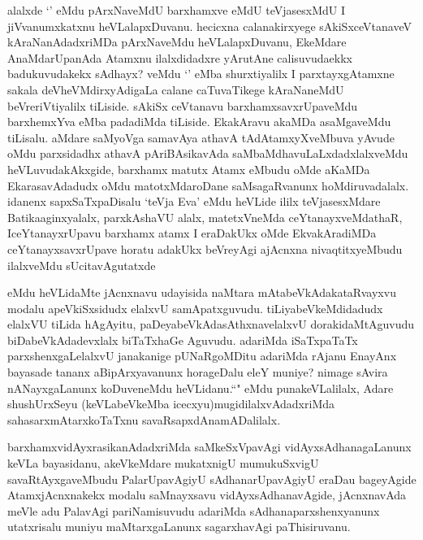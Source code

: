 \begin{artha}
alalxde `\stext' eMdu pArxNaveMdU barxhamxve eMdU teVjasesxMdU I jiVvanumxkatxnu heVLalapxDuvanu. hecicxna calanakirxyege sAkiSxceVtanaveV kAraNanAdadxriMDa pArxNaveMdu heVLalapxDuvanu, EkeMdare AnaMdarUpanAda Atamxnu ilalxdidadxre yArutAne calisuvudaekkx badukuvudakekx sAdhayx? veMdu `\stext' eMba shurxtiyalilx I parxtayxgAtamxne sakala deVheVMdirxyAdigaLa calane caTuvaTikege kAraNaneMdU beVreriVtiyalilx tiLiside. sAkiSx ceVtanavu barxhamxsavxrUpaveMdu barxhemxYva eMba padadiMda tiLiside. EkakAravu akaMDa asaMgaveMdu tiLisalu. aMdare saMyoVga samavAya athavA tAdAtamxyXveMbuva yAvude oMdu parxsidadhx athavA pAriBAsikavAda saMbaMdhavuLaLxdadxlalxveMdu heVLuvudakAkxgide, barxhamx matutx Atamx eMbudu oMde aKaMDa EkarasavAdadudx oMdu matotxMdaroDane saMsagaRvanunx hoMdiruvadalalx. idanenx sapxSaTxpaDisalu `teVja Eva' eMdu heVLide ililx teVjasesxMdare Batikaaginxyalalx, parxkAshaVU alalx, matetxVneMda ceYtanayxveMdathaR, IceYtanayxrUpavu barxhamx atamx I eraDakUkx oMde EkvakAradiMDa ceYtanayxsavxrUpave horatu adakUkx beVreyAgi ajAcnxna nivaqtitxyeMbudu ilalxveMdu sUcitavAgutatxde
\end{artha}

\begin{artha}
eMdu heVLidaMte jAcnxnavu udayisida naMtara mAtabeVkAdakataRvayxvu modalu apeVkiSxsidudx elalxvU samApatxguvudu. tiLiyabeVkeMdidadudx elalxVU tiLida hAgAyitu, paDeyabeVkAdasAthxnavelalxvU dorakidaMtAguvudu biDabeVkAdadevxlalx biTaTxhaGe Aguvudu. adariMda iSaTxpaTaTx parxshenxgaLelalxvU janakanige pUNaRgoMDitu adariMda rAjanu EnayAnx bayasade tananx aBipArxyavanunx horageDalu eleY muniye? nimage sAvira nANayxgaLanunx koDuveneMdu heVLidanu.``\stext" eMdu punakeVLalilalx, Adare shushUrxSeyu (keVLabeVkeMba icecxyu)mugidilalxvAdadxriMda sahasarxmAtarxkoTaTxnu savaRsapxdAnamADalilalx.
\end{artha}

\begin{artha}
barxhamxvidAyxrasikanAdadxriMda saMkeSxVpavAgi vidAyxsAdhanagaLanunx keVLa bayasidanu, akeVkeMdare mukatxnigU mumukuSxvigU savaRtAyxgaveMbudu PalarUpavAgiyU sAdhanarUpavAgiyU eraDau bageyAgide AtamxjAcnxnakekx modalu saMnayxsavu vidAyxsAdhanavAgide, jAcnxnavAda meVle adu PalavAgi pariNamisuvudu adariMda sAdhanaparxshenxyanunx utatxrisalu muniyu maMtarxgaLanunx sagarxhavAgi paThisiruvanu.
\end{artha}
